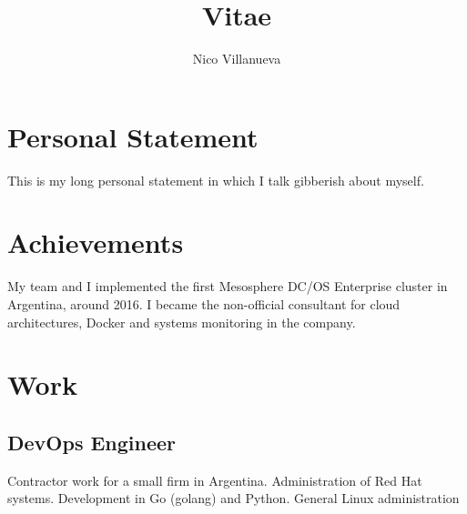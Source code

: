 \documentclass{my_cv}
\title{Vitae}
\author{Nico Villanueva}
\begin{document}
\maketitle

\section{Personal Statement}
This is my long personal statement in which I talk gibberish about myself.
\section{Achievements}
My team and I implemented the first Mesosphere DC/OS Enterprise cluster in Argentina, around 2016. I became the non-official consultant for cloud architectures, Docker and systems monitoring in the company.
\section{Work}
\subsection{DevOps Engineer}
Contractor work for a small firm in Argentina.
Administration of Red Hat systems.
Development in Go (golang) and Python. General Linux administration
\end{document}
